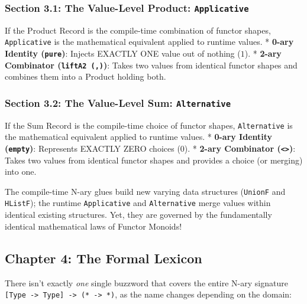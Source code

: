 \documentclass[
]{article}
\begin{document}
\subsubsection{\texorpdfstring{Section 3.1: The Value-Level Product:
\texttt{Applicative}}{Section 3.1: The Value-Level Product: Applicative}}\label{section-3.1-the-value-level-product-applicative}

If the Product Record is the compile-time combination of functor shapes,
\texttt{Applicative} is the mathematical equivalent applied to runtime
values. * \textbf{0-ary Identity (\texttt{pure})}: Injects EXACTLY ONE
value out of nothing (\(1\)). * \textbf{2-ary Combinator
(\texttt{liftA2\ (,)})}: Takes two values from identical functor shapes
and combines them into a Product holding both.

\subsubsection{\texorpdfstring{Section 3.2: The Value-Level Sum:
\texttt{Alternative}}{Section 3.2: The Value-Level Sum: Alternative}}\label{section-3.2-the-value-level-sum-alternative}

If the Sum Record is the compile-time choice of functor shapes,
\texttt{Alternative} is the mathematical equivalent applied to runtime
values. * \textbf{0-ary Identity (\texttt{empty})}: Represents EXACTLY
ZERO choices (\(0\)). * \textbf{2-ary Combinator
(\texttt{\textless{}\textbar{}\textgreater{}})}: Takes two values from
identical functor shapes and provides a choice (or merging) into one.

The compile-time N-ary glues build new varying data structures
(\texttt{UnionF} and \texttt{HListF}); the runtime \texttt{Applicative}
and \texttt{Alternative} merge values within identical existing
structures. Yet, they are governed by the fundamentally identical
mathematical laws of Functor Monoids!

\subsection{Chapter 4: The Formal
Lexicon}\label{chapter-4-the-formal-lexicon}

There isn't exactly \emph{one} single buzzword that covers the entire
N-ary signature
\texttt{{[}Type\ -\textgreater{}\ Type{]}\ -\textgreater{}\ (*\ -\textgreater{}\ *)},
as the name changes depending on the domain:
\end{document}
